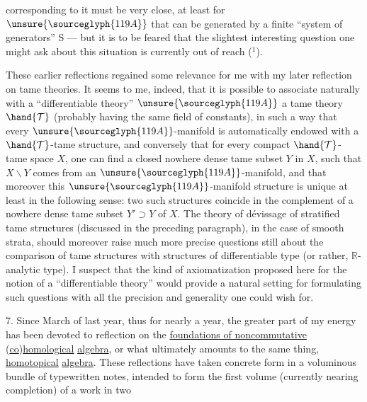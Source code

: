 
corresponding to it must be very close, at least for $\unsure{\sourceglyph{119A}}$ that
can be generated by a finite ``system of generators'' S ---
but it is to be feared that the slightest interesting question one
might ask about this situation is currently out of
reach ($^1$).

These earlier reflections regained some relevance
for me with my later reflection on tame theories.
It seems to me, indeed, that it is possible to associate naturally
with a ``differentiable theory'' $\unsure{\sourceglyph{119A}}$ a tame theory $\hand{\mathcal{T}}$
(probably having the same field of constants), in such a way that
every $\unsure{\sourceglyph{119A}}$-manifold is automatically endowed with a $\hand{\mathcal{T}}$-tame structure,
and conversely that for every compact $\hand{\mathcal{T}}$-tame space $X$, one can
find a closed nowhere dense tame subset $Y$ in $X$, such that $X \smallsetminus Y$
comes from an $\unsure{\sourceglyph{119A}}$-manifold, and that moreover this $\unsure{\sourceglyph{119A}}$-manifold
structure is unique at least in the following sense: two such
structures coincide in the complement of a nowhere dense tame
subset $Y' \supset Y$ of $X$. The theory of dévissage of
stratified tame structures (discussed in the preceding paragraph),
in the case of smooth strata, should moreover raise
much more precise questions still about the comparison of tame
structures with structures of differentiable type (or rather,
$\mathbb{R}$-analytic type). I suspect that the kind of axiomatization proposed
here for the notion of a ``differentiable theory'' would provide a
natural setting for formulating such questions with all the precision
and generality one could wish for.


7. Since March of last year, thus for nearly
a year, the greater part of my energy has been devoted to
reflection on the \uline{foundations of noncommutative} (\uline{co})\uline{homological}
\uline{algebra}, or what ultimately amounts to the same thing, \uline{homotopical}
\uline{algebra}. These reflections have taken concrete form in a voluminous
bundle of typewritten notes, intended to form the first
volume (currently nearing completion) of a work in two

